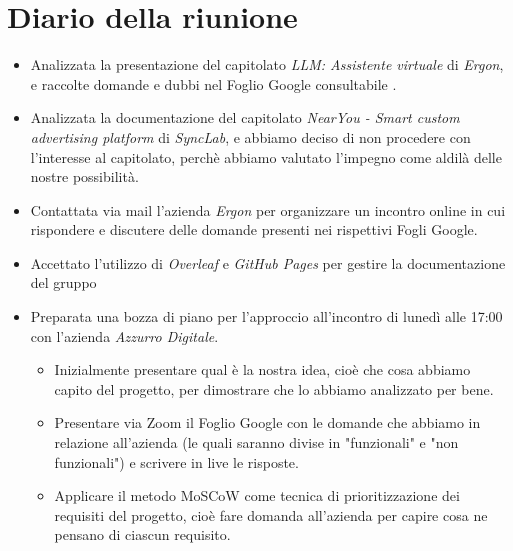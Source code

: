 \section{Diario della riunione}

\begin{itemize}
    \item Analizzata la presentazione del capitolato \emph{LLM: Assistente virtuale} di \emph{Ergon}, e raccolte domande e dubbi nel Foglio Google consultabile .
    
    \item Analizzata la documentazione del capitolato \emph{NearYou - Smart custom advertising platform} di \emph{SyncLab}, e abbiamo deciso di non procedere con l'interesse al capitolato, perchè abbiamo valutato l'impegno come aldilà delle nostre possibilità.
    
    \item Contattata via mail l'azienda \emph{Ergon} per organizzare un incontro online in cui rispondere e discutere delle domande presenti nei rispettivi Fogli Google.

    \item Accettato l'utilizzo di \emph{Overleaf} e \emph{GitHub Pages} per gestire la documentazione del gruppo

    \item Preparata una bozza di piano per l'approccio all'incontro di lunedì alle 17:00 con l'azienda \emph{Azzurro Digitale}. 
    \begin{itemize}
        \renewcommand{\labelitemii}{--}
        \item Inizialmente presentare qual è la nostra idea, cioè che cosa abbiamo capito del progetto, per dimostrare che lo abbiamo analizzato per bene.
        \item Presentare via Zoom il Foglio Google con le domande che abbiamo in relazione all'azienda (le quali saranno divise in "funzionali" e "non funzionali") e scrivere in live le risposte.
        \item Applicare il metodo MoSCoW come tecnica di prioritizzazione dei requisiti del progetto, cioè fare domanda all'azienda per capire cosa ne pensano di ciascun requisito.
    \end{itemize}
\end{itemize}